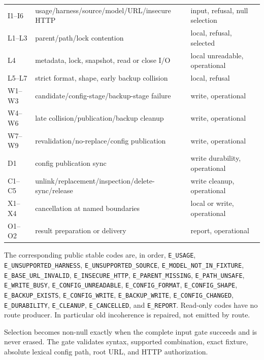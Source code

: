 \documentclass{article}
\begin{document}
\begin{center}
	\begin{tabular}{lll}
		I1--I6 & usage/harness/source/model/URL/insecure HTTP      & input, refusal, null selection \\
		L1--L3 & parent/path/lock contention                       & local, refusal, selected       \\
		L4     & metadata, lock, snapshot, read or close I/O       & local unreadable, operational  \\
		L5--L7 & strict format, shape, early backup collision      & local, refusal                 \\
		W1--W3 & candidate/config-stage/backup-stage failure       & write, operational             \\
		W4--W6 & late collision/publication/backup cleanup         & write, operational             \\
		W7--W9 & revalidation/no-replace/config publication        & write, operational             \\
		D1     & config publication sync                           & write durability, operational  \\
		C1--C5 & unlink/replacement/inspection/delete-sync/release & write cleanup, operational     \\
		X1--X4 & cancellation at named boundaries                  & local or write, operational    \\
		O1--O2 & result preparation or delivery                    & report, operational
	\end{tabular}
\end{center}

The corresponding public stable codes are, in order,
\texttt{E\_USAGE}, \texttt{E\_UNSUPPORTED\_HARNESS},
\texttt{E\_UNSUPPORTED\_SOURCE}, \texttt{E\_MODEL\_NOT\_IN\_FIXTURE},
\texttt{E\_BASE\_URL\_INVALID}, \texttt{E\_INSECURE\_HTTP},
\texttt{E\_PARENT\_MISSING}, \texttt{E\_PATH\_UNSAFE},
\texttt{E\_WRITE\_BUSY}, \texttt{E\_CONFIG\_UNREADABLE},
\texttt{E\_CONFIG\_FORMAT}, \texttt{E\_CONFIG\_SHAPE},
\texttt{E\_BACKUP\_EXISTS}, \texttt{E\_CONFIG\_WRITE},
\texttt{E\_BACKUP\_WRITE}, \texttt{E\_CONFIG\_CHANGED},
\texttt{E\_DURABILITY}, \texttt{E\_CLEANUP},
\texttt{E\_CANCELLED}, and \texttt{E\_REPORT}.  Read-only codes have no route
producer.  In particular old incoherence is repaired, not emitted by route.

Selection becomes non-null exactly when the complete input gate succeeds and is
never erased.  The gate validates syntax, supported combination, exact fixture,
absolute lexical config path, root URL, and HTTP authorization.
\end{document}
